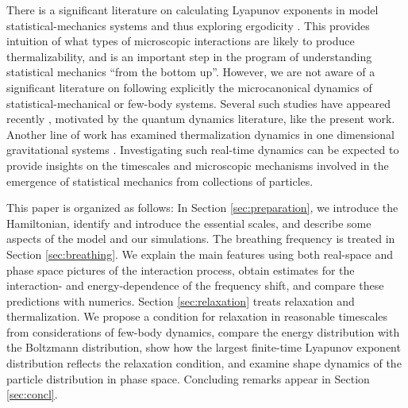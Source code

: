 \documentclass[a4paper, onecolumn]{revtex4-1}
\begin{document}
There is a significant literature on calculating Lyapunov exponents in model statistical-mechanics
systems and thus exploring ergodicity \cite{Dorfman_book_1999, deWijn_fine,
  Lyapunov_numerical_calculations, Lyapunov_analytical_calculations, FiniteTimeLyapunov}.  This
provides intuition of what types of microscopic interactions are likely to produce thermalizability,
and is an important step in the program of understanding statistical mechanics ``from the bottom
up''.  However, we are not aware of a significant literature on following explicitly the
microcanonical dynamics of statistical-mechanical or few-body systems.  Several such studies have
appeared recently \cite{DoyonSpohn_JSTAT17, Moore_arXiv17.10, JinKatsnelson_NJP13}, motivated by the
quantum dynamics literature, like the present work.  Another line of work has examined
thermalization dynamics in one dimensional gravitational systems \cite{1Dgravitational}.
%
Investigating such real-time dynamics can be expected to provide insights on the timescales and
microscopic mechanisms involved in the emergence of statistical mechanics from collections of
particles.


This paper is organized as follows: In Section \ref{sec:preparation}, we introduce the Hamiltonian,
identify and introduce the essential scales, and describe some aspects of the model and our
simulations.  The breathing frequency is treated in Section \ref{sec:breathing}.  We explain the
main features using both real-space and phase space pictures of the interaction process, obtain
estimates for the interaction- and energy-dependence of the frequency shift, and compare these
predictions with numerics.  Section \ref{sec:relaxation} treats relaxation and thermalization.  We
propose a condition for relaxation in reasonable timescales from considerations of few-body
dynamics, compare the energy distribution with the Boltzmann distribution, show how the largest
finite-time Lyapunov exponent distribution reflects the relaxation condition, and examine shape
dynamics of the particle distribution in phase space.  Concluding remarks appear in Section
\ref{sec:concl}.
\end{document}

